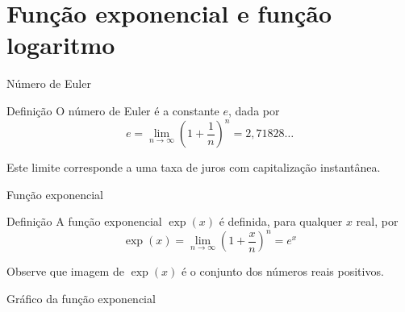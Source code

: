 \section*{Função exponencial e função logaritmo}

\begin{frame}[fragile]{Número de Euler}

    \begin{block}{Definição}
        O número de Euler é a constante $e$, dada por
        $$
            e = \lim_{n\to \infty} \left(1 + \frac{1}{n}\right)^n = 2,71828\ldots
        $$

    \end{block}

    \vspace{0.2in}

    Este limite corresponde a uma taxa de juros com capitalização instantânea.

\end{frame}

\begin{frame}[fragile]{Função exponencial}

    \begin{block}{Definição}
        A função exponencial $\exp(x)$ é definida, para qualquer $x$ real, por
        $$
            \exp(x) = \lim_{n\to \infty} \left(1 + \frac{x}{n}\right)^n = e^x
        $$
    \end{block}

    \vspace{0.2in}

    Observe que imagem de $\exp(x)$ é o conjunto dos números reais positivos.
\end{frame}

\begin{frame}[fragile]{Gráfico da função exponencial}

    \begin{figure}
        \centering

    \end{figure}

\end{frame}

